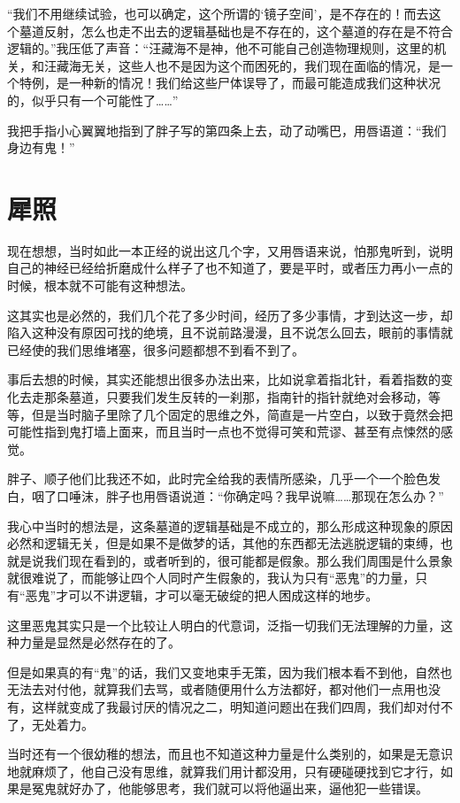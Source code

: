 “我们不用继续试验，也可以确定，这个所谓的‘镜子空间’，是不存在的！而去这个墓道反射，怎么也走不出去的逻辑基础也是不存在的，这个墓道的存在是不符合逻辑的。”我压低了声音：“汪藏海不是神，他不可能自己创造物理规则，这里的机关，和汪藏海无关，这些人也不是因为这个而困死的，我们现在面临的情况，是一个特例，是一种新的情况！我们给这些尸体误导了，而最可能造成我们这种状况的，似乎只有一个可能性了……”

我把手指小心翼翼地指到了胖子写的第四条上去，动了动嘴巴，用唇语道：“我们身边有鬼！”

\chapter{犀照}

现在想想，当时如此一本正经的说出这几个字，又用唇语来说，怕那鬼听到，说明自己的神经已经给折磨成什么样子了也不知道了，要是平时，或者压力再小一点的时候，根本就不可能有这种想法。

这其实也是必然的，我们几个花了多少时间，经历了多少事情，才到达这一步，却陷入这种没有原因可找的绝境，且不说前路漫漫，且不说怎么回去，眼前的事情就已经使的我们思维堵塞，很多问题都想不到看不到了。

事后去想的时候，其实还能想出很多办法出来，比如说拿着指北针，看着指数的变化去走那条墓道，只要我们发生反转的一刹那，指南针的指针就绝对会移动，等等，但是当时脑子里除了几个固定的思维之外，简直是一片空白，以致于竟然会把可能性指到鬼打墙上面来，而且当时一点也不觉得可笑和荒谬、甚至有点悚然的感觉。

胖子、顺子他们比我还不如，此时完全给我的表情所感染，几乎一个一个脸色发白，咽了口唾沫，胖子也用唇语说道：“你确定吗？我早说嘛……那现在怎么办？”

我心中当时的想法是，这条墓道的逻辑基础是不成立的，那么形成这种现象的原因必然和逻辑无关，但是如果不是做梦的话，其他的东西都无法逃脱逻辑的束缚，也就是说我们现在看到的，或者听到的，很可能都是假象。那么我们周围是什么景象就很难说了，而能够让四个人同时产生假象的，我认为只有“恶鬼”的力量，只有“恶鬼”才可以不讲逻辑，才可以毫无破绽的把人困成这样的地步。

这里恶鬼其实只是一个比较让人明白的代意词，泛指一切我们无法理解的力量，这种力量是显然是必然存在的了。

但是如果真的有“鬼”的话，我们又变地束手无策，因为我们根本看不到他，自然也无法去对付他，就算我们去骂，或者随便用什么方法都好，都对他们一点用也没有，这样就变成了我最讨厌的情况之二，明知道问题出在我们四周，我们却对付不了，无处着力。

当时还有一个很幼稚的想法，而且也不知道这种力量是什么类别的，如果是无意识地就麻烦了，他自己没有思维，就算我们用计都没用，只有硬碰硬找到它才行，如果是冤鬼就好办了，他能够思考，我们就可以将他逼出来，逼他犯一些错误。

